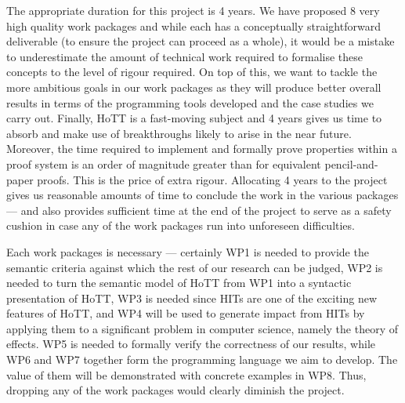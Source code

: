 \documentclass[a4paper,11pt]{article}
\begin{document}
\vspace{0.02in}

 The appropriate duration for
this project is 4 years. We have proposed 8 very high quality work
packages and while each has a conceptually straightforward deliverable
(to ensure the project can proceed as a whole), it would be a mistake
to underestimate the amount of technical work required to formalise these
concepts to the level of rigour required. On top of this,
we want to tackle the more ambitious goals in our work packages as
they will produce better overall results in terms of the programming
tools developed and the case studies we carry out. Finally,
HoTT is a fast-moving subject and 4 years gives us time to absorb and
make use of breakthroughs likely to arise in the near future.
Moreover, the time required to implement and formally prove properties
within a proof system is an order of magnitude greater than for
equivalent pencil-and-paper proofs. This is the price of extra
rigour. Allocating 4 years to the project gives us reasonable amounts
of time to conclude the work in the various packages
--- and also
provides sufficient time at the end of the project to serve as a
safety cushion in case any of the work packages run into unforeseen
difficulties.

\noindent Each work packages is necessary --- certainly WP1 is needed
to provide the semantic criteria against which the 
rest of our research can be judged, WP2 is needed to turn the semantic
model of HoTT from WP1 into a syntactic presentation of HoTT, WP3 is
needed since HITs are one of the exciting new features of HoTT, and
WP4 will be used to generate impact from HITs by applying them to a
significant problem in computer science, namely the theory of
effects. WP5 is needed to formally verify the correctness of our results, while WP6 and WP7 together form the programming language
we aim to develop. The value of them will be demonstrated with
concrete examples in WP8.  Thus, dropping any of the work packages
would clearly diminish the project.

\vspace{0.02in}
\end{document}
